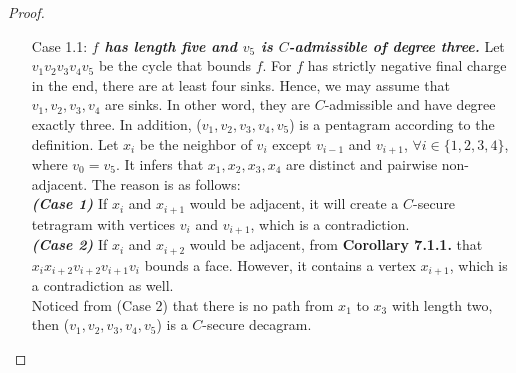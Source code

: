 \begin{proof}
\begin{itemize}
    \item[Case 1.1: ] \textit{\textbf{$f$ has length five and $v_5$ is $C$-admissible of degree three.}} Let $v_1v_2v_3v_4v_5$ be the cycle that bounds $f$. For $f$ has strictly negative final charge in the end, there are at least four sinks. Hence, we may assume that $v_1, v_2, v_3, v_4$ are sinks. In other word, they are $C$-admissible and have degree exactly three. In addition, ($v_1, v_2, v_3, v_4, v_5$) is a pentagram according to the definition. Let $x_i$ be the neighbor of $v_i$ except $v_{i-1}$ and $v_{i+1}$, $\forall i \in \{1, 2, 3, 4\}$, where $v_0 = v_5$. It infers that $x_1, x_2, x_3, x_4$ are distinct and pairwise non-adjacent. The reason is as follows:\\
    \textit{\textbf{(Case 1)}} If $x_i$ and $x_{i+1}$ would be adjacent, it will create a $C$-secure tetragram with vertices $v_i$ and $v_{i+1}$, which is a contradiction.\\
    \textit{\textbf{(Case 2)}} If $x_i$ and $x_{i+2}$ would be adjacent, from \textbf{Corollary 7.1.1.} that $x_ix_{i+2}v_{i+2}v_{i+1}v_{i}$ bounds a face. However, it contains a vertex $x_{i+1}$, which is a contradiction as well.\\
    Noticed from (Case 2) that there is no path from $x_1$ to $x_3$ with length two, then ($v_1, v_2, v_3, v_4, v_5$) is a $C$-secure decagram.
    
    
    

\end{itemize}
\end{proof}

